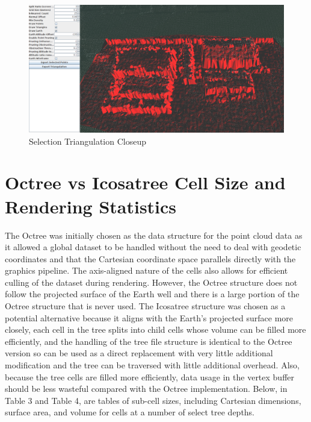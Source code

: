 \begin{figure}[htp]
\begin{center}
  \includegraphics[width=6.0in]{images/triangulation4.png}
  \caption{Selection Triangulation Closeup}
  \label{fig:triangulation4}
\end{center}
\end{figure}

\section{Octree vs Icosatree Cell Size and Rendering Statistics}

The Octree was initially chosen as the data structure for the point cloud data as it allowed a global dataset to be handled without the need to deal with geodetic coordinates and that the Cartesian coordinate space parallels directly with the graphics pipeline. The axis-aligned nature of the cells also allows for efficient culling of the dataset during rendering. However, the Octree structure does not follow the projected surface of the Earth well and there is a large portion of the Octree structure that is never used. The Icosatree structure was chosen as a potential alternative because it aligns with the Earth’s projected surface more closely, each cell in the tree splits into child cells whose volume can be filled more efficiently, and the handling of the tree file structure is identical to the Octree version so can be used as a direct replacement with very little additional modification and the tree can be traversed with little additional overhead. Also, because the tree cells are filled more efficiently, data usage in the vertex buffer should be less wasteful compared with the Octree implementation. Below, in Table 3 and Table 4, are tables of sub-cell sizes, including Cartesian dimensions, surface area, and volume for cells at a number of select tree depths.

